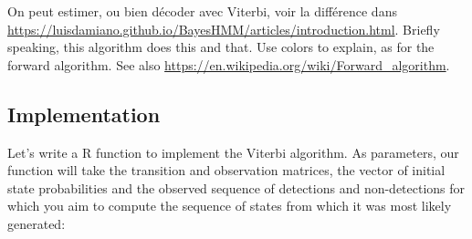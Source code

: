 \documentclass[
  12pt,
]{krantz}
\begin{document}
On peut estimer, ou bien décoder avec Viterbi, voir la différence dans \url{https://luisdamiano.github.io/BayesHMM/articles/introduction.html}. Briefly speaking, this algorithm does this and that. Use colors to explain, as for the forward algorithm. See also \url{https://en.wikipedia.org/wiki/Forward_algorithm}.

\hypertarget{implementation}{%
\subsection{Implementation}\label{implementation}}

Let's write a R function to implement the Viterbi algorithm. As parameters, our function will take the transition and observation matrices, the vector of initial state probabilities and the observed sequence of detections and non-detections for which you aim to compute the sequence of states from which it was most likely generated:
\end{document}

